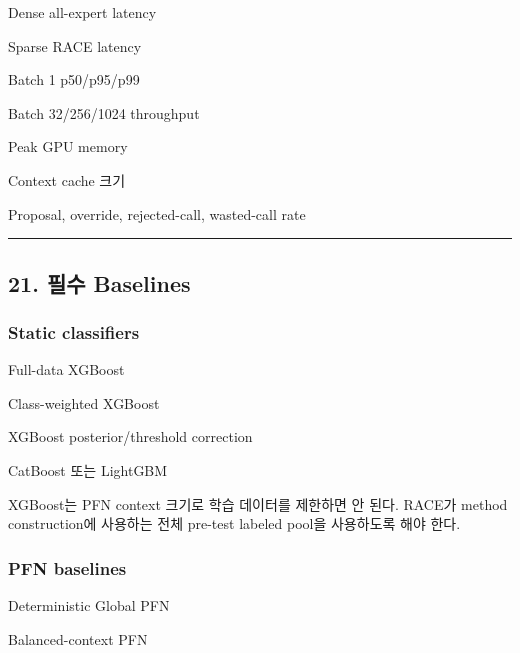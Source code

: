 \par\noindent \textbullet\enspace Dense all-expert latency


\par\noindent \textbullet\enspace Sparse RACE latency


\par\noindent \textbullet\enspace Batch 1 p50/\allowbreak{}p95/\allowbreak{}p99


\par\noindent \textbullet\enspace Batch 32/\allowbreak{}256/\allowbreak{}1024 throughput


\par\noindent \textbullet\enspace Peak GPU memory


\par\noindent \textbullet\enspace Context cache 크기


\par\noindent \textbullet\enspace Proposal, override, rejected-call, wasted-call rate



\medskip\hrule\medskip
\subsection{21. 필수 Baselines}
\subsubsection{Static classifiers}
\par\noindent \textbullet\enspace Full-data XGBoost


\par\noindent \textbullet\enspace Class-weighted XGBoost


\par\noindent \textbullet\enspace XGBoost posterior/\allowbreak{}threshold correction


\par\noindent \textbullet\enspace CatBoost 또는 LightGBM


XGBoost는 PFN context 크기로 학습 데이터를 제한하면 안 된다. RACE가 method construction에 사용하는 전체 pre-test labeled pool을 사용하도록 해야 한다.

\subsubsection{PFN baselines}
\par\noindent \textbullet\enspace Deterministic Global PFN


\par\noindent \textbullet\enspace Balanced-context PFN


